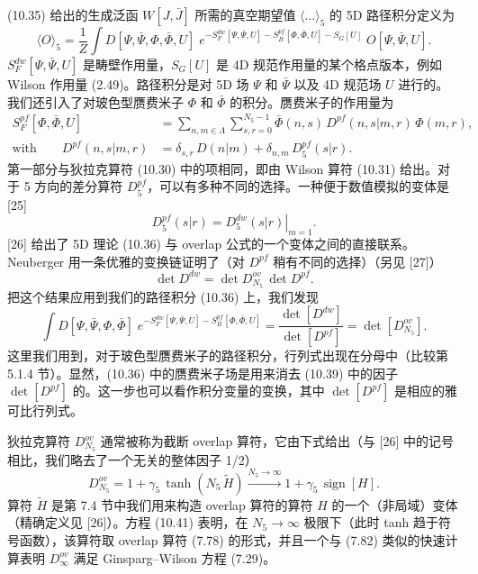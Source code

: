 (10.35) 给出的生成泛函 $W[J, \bar J]$ 所需的真空期望值 $\langle\ldots\rangle_5$ 的 5D 路径积分定义为
\begin{equation}
  \langle O\rangle_5 = \frac{1}{Z}
  \int D[\Psi, \bar\Psi, \Phi, \bar\Phi, U]\;
  e^{-S_F^{dw}[\Psi,\bar\Psi,U] - S_B^{pf}[\Phi,\bar\Phi,U] - S_G[U]}\;
  O[\Psi, \bar\Psi, U] .
\end{equation}
$S_F^{dw}[\Psi, \bar\Psi, U]$ 是畴壁作用量，$S_G[U]$ 是 4D 规范作用量的某个格点版本，例如 Wilson 作用量 (2.49)。路径积分是对 5D 场 $\Psi$ 和 $\bar\Psi$ 以及 4D 规范场 $U$ 进行的。我们还引入了对玻色型赝费米子 $\Phi$ 和 $\bar\Phi$ 的积分。赝费米子的作用量为
\begin{equation}
  \begin{split}
    S_F^{pf}[\Phi, \bar\Phi, U] &=
    \sum_{n,m\in\Lambda}\sum_{s,r=0}^{N_5-1}
    \bar\Phi(n, s)\, D^{pf}(n, s|m, r)\, \Phi(m, r) , \\
    \text{with} \qquad D^{pf}(n, s|m, r) &= \delta_{s,r}\, D(n|m)
    + \delta_{n,m}\, D_5^{pf}(s|r) .
  \end{split}
\end{equation}
第一部分与狄拉克算符 (10.30) 中的项相同，即由 Wilson 算符 (10.31) 给出。对于 5 方向的差分算符 $D_5^{pf}$，可以有多种不同的选择。一种便于数值模拟的变体是 [25]
\begin{equation}
  D_5^{pf}(s|r) = \left. D_5^{dw}(s|r) \right|_{m=1} .
\end{equation}
[26] 给出了 5D 理论 (10.36) 与 overlap 公式的一个变体之间的直接联系。Neuberger 用一条优雅的变换链证明了（对 $D^{pf}$ 稍有不同的选择）（另见 [27]）
\begin{equation}
  \det D^{dw} = \det D_{N_5}^{ov}\, \det D^{pf} .
\end{equation}
把这个结果应用到我们的路径积分 (10.36) 上，我们发现
\begin{equation}
  \int D[\Psi, \bar\Psi, \Phi, \bar\Phi]\;
  e^{-S_F^{dw}[\Psi,\bar\Psi,U] - S_B^{pf}[\Phi,\bar\Phi,U]}
  = \frac{\det[D^{dw}]}{\det[D^{pf}]}
  = \det\left[D_{N_5}^{ov}\right] .
\end{equation}
这里我们用到，对于玻色型赝费米子的路径积分，行列式出现在分母中（比较第 5.1.4 节）。显然，(10.36) 中的赝费米子场是用来消去 (10.39) 中的因子 $\det[D^{pf}]$ 的。这一步也可以看作积分变量的变换，其中 $\det[D^{pf}]$ 是相应的雅可比行列式。

狄拉克算符 $D_{N_5}^{ov}$ 通常被称为截断 overlap 算符，它由下式给出（与 [26] 中的记号相比，我们略去了一个无关的整体因子 1/2）
\begin{equation}
  D_{N_5}^{ov} = 1 + \gamma_5\, \tanh\left(N_5\, \tilde H\right)
  \xrightarrow{N_5\to\infty}
  1 + \gamma_5\, \operatorname{sign}[H] .
\end{equation}
算符 $\tilde H$ 是第 7.4 节中我们用来构造 overlap 算符的算符 $H$ 的一个（非局域）变体（精确定义见 [26]）。方程 (10.41) 表明，在 $N_5 \to \infty$ 极限下（此时 tanh 趋于符号函数），该算符取 overlap 算符 (7.78) 的形式，并且一个与 (7.82) 类似的快速计算表明 $D_{\infty}^{ov}$ 满足 Ginsparg--Wilson 方程 (7.29)。

